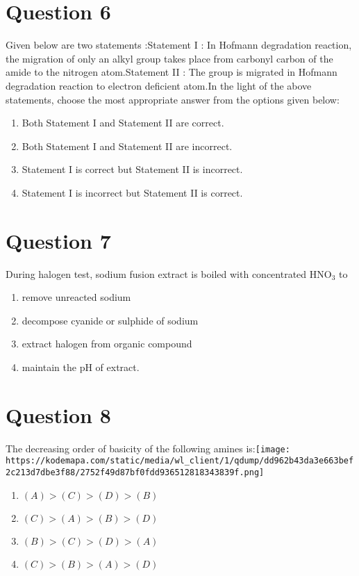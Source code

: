 \documentclass{article}
\begin{document}
\section*{Question 6}
Given below are two statements :Statement I : In Hofmann degradation reaction, the migration of only an alkyl group takes place from carbonyl carbon of the amide to the nitrogen atom.Statement II : The group is migrated in Hofmann degradation reaction to electron deficient atom.In the light of the above statements, choose the most appropriate answer from the options given below: 
\begin{enumerate}[label=(\alph*)]
\item Both Statement I and Statement II are correct.
\item Both Statement I and Statement II are incorrect.
\item Statement I is correct but Statement II is incorrect.
\item Statement I is incorrect but Statement II is correct.
\end{enumerate}
\newpage
\section*{Question 7}
During halogen test, sodium fusion extract is boiled with concentrated \(\mathrm{HNO}_3\) to 
\begin{enumerate}[label=(\alph*)]
\item remove unreacted sodium
\item decompose cyanide or sulphide of sodium
\item extract halogen from organic compound
\item maintain the \(\mathrm{pH}\) of extract.
\end{enumerate}
\newpage
\section*{Question 8}
The decreasing order of basicity of the following amines is:\texttt{[image: https://kodemapa.com/static/media/wl\_client/1/qdump/dd962b43da3e663bef2c213d7dbe3f88/2752f49d87bf0fdd936512818343839f.png]}\newline
\begin{enumerate}[label=(\alph*)]
\item \((A)>(C)>(D)>(B)\)
\item \((C)>(A)>(B)>(D)\)
\item \((B)>(C)>(D)>(A)\)
\item \((C)>(B)>(A)>(D)\)
\end{enumerate}
\newpage
\end{document}
